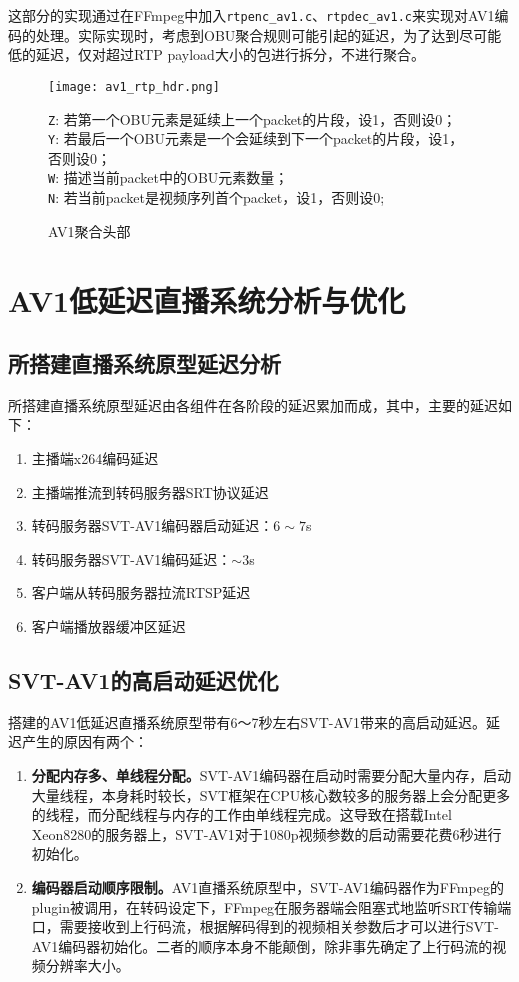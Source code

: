 	这部分的实现通过在FFmpeg中加入\texttt{rtpenc\_av1.c}、\texttt{rtpdec\_av1.c}来实现对AV1编码的处理。实际实现时，考虑到OBU聚合规则可能引起的延迟，为了达到尽可能低的延迟，仅对超过RTP payload大小的包进行拆分，不进行聚合。
	
	\begin{figure}[!htp]
		\centering
		\texttt{[image: av1\_rtp\_hdr.png]} \\
		\raggedright
		\texttt{Z}: 若第一个OBU元素是延续上一个packet的片段，设1，否则设0；\\
		\texttt{Y}: 若最后一个OBU元素是一个会延续到下一个packet的片段，设1，否则设0；\\
		\texttt{W}: 描述当前packet中的OBU元素数量；\\
		\texttt{N}: 若当前packet是视频序列首个packet，设1，否则设0;\\
		\caption{AV1聚合头部}
		\label{fig:av1rtp-aggr}
	\end{figure}
\section{AV1低延迟直播系统分析与优化}

\subsection{所搭建直播系统原型延迟分析}
	所搭建直播系统原型延迟由各组件在各阶段的延迟累加而成，其中，主要的延迟如下：
	\begin{enumerate} [label=\arabic*)]
		\item 主播端x264编码延迟
		\item 主播端推流到转码服务器SRT协议延迟
		\item 转码服务器SVT-AV1编码器启动延迟：$6\sim 7$s
		\item 转码服务器SVT-AV1编码延迟：$\sim 3$s
		\item 客户端从转码服务器拉流RTSP延迟
		\item 客户端播放器缓冲区延迟
	\end{enumerate}
\subsection{SVT-AV1的高启动延迟优化}
  搭建的AV1低延迟直播系统原型带有6～7秒左右SVT-AV1带来的高启动延迟。延迟产生的原因有两个：

  \begin{enumerate} [label=\arabic*)]
    \item \textbf{分配内存多、单线程分配。}SVT-AV1编码器在启动时需要分配大量内存，启动大量线程，本身耗时较长，SVT框架在CPU核心数较多的服务器上会分配更多的线程，而分配线程与内存的工作由单线程完成。这导致在搭载Intel Xeon8280的服务器上，SVT-AV1对于1080p视频参数的启动需要花费6秒进行初始化。
    \item \textbf{编码器启动顺序限制。}AV1直播系统原型中，SVT-AV1编码器作为FFmpeg的plugin被调用，在转码设定下，FFmpeg在服务器端会阻塞式地监听SRT传输端口，需要接收到上行码流，根据解码得到的视频相关参数后才可以进行SVT-AV1编码器初始化。二者的顺序本身不能颠倒，除非事先确定了上行码流的视频分辨率大小。
  \end{enumerate}

